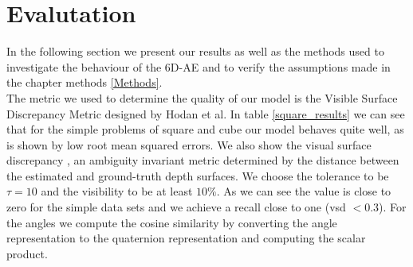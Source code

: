 \documentclass[10pt,a4paper]{article}
\begin{document}
\newpage
\section{Evalutation}\label{Evaluation}
In the following section we present our results as well as the methods used to investigate the behaviour of the 6D-AE and to verify the assumptions made in the chapter methods \ref{Methods}.\\
The metric we used to determine the quality of our model is the Visible Surface Discrepancy Metric designed by Hodan et al. 
In table \ref{square_results} we can see that for the simple problems of square
and cube our model behaves quite well, as is shown by low root mean squared
errors. We also show the visual surface discrepancy \cite{hodavn2016evaluation}, an ambiguity
invariant metric determined by the distance between the estimated and
ground-truth depth surfaces. We choose the tolerance to be $\tau = 10$
and the visibility to be at least $10\%$. As we can see the value is close to
zero for the simple data sets and we achieve a recall close to one (vsd $<
0.3$). For the angles we compute the cosine similarity by converting the angle
representation to the quaternion representation and computing the scalar
product.
\end{document}
